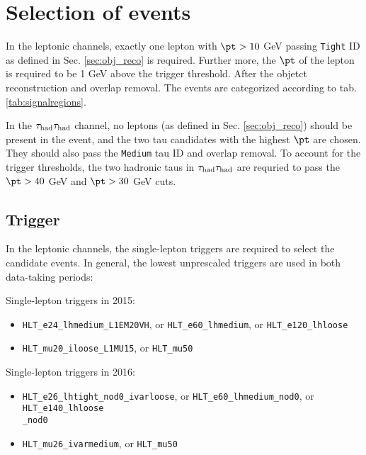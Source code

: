 \section{Selection of events}
\label{sec:selection}

In the leptonic channels, exactly one lepton with $\pt>10$ GeV passing \texttt{Tight} ID as defined in Sec. \ref{sec:obj_reco} is required. %
Further more, the $\pt$ of the lepton is required to be 1 GeV above the trigger threshold. After the objetct reconstruction and overlap removal. The events are categorized according to tab. \ref{tab:signalregions}.


 In the $\tau_\text{had}{}\tau_\text{had}$ channel, no leptons (as defined in Sec. \ref{sec:obj_reco}) should be present in the event, and the two tau candidates with the highest $\pt$ are chosen. They should also pass the \texttt{Medium} tau ID and overlap removal. To account for the trigger thresholds, the two hadronic taus in $\tau_\text{had}{}\tau_\text{had}$ are requried to pass the $\pt>40$ GeV and $\pt>30$ GeV cuts.

\subsection{Trigger}
\label{sec:trigger}

In the leptonic channels, the single-lepton triggers are required to select the candidate events. In general, the lowest unprescaled triggers are used in both data-taking periods:

\begin{description}
\item Single-lepton triggers in 2015:
  
  \begin{itemize}
  \item \texttt{HLT\_e24\_lhmedium\_L1EM20VH}, or \texttt{HLT\_e60\_lhmedium}, or \texttt{HLT\_e120\_lhloose}
  \item \texttt{HLT\_mu20\_iloose\_L1MU15}, or \texttt{HLT\_mu50}
  \end{itemize}
  
\item Single-lepton triggers in 2016:
  
  \begin{itemize}
  \item \texttt{HLT\_e26\_lhtight\_nod0\_ivarloose}, or \texttt{HLT\_e60\_lhmedium\_nod0}, or \texttt{HLT\_e140\_lhloose\\\_nod0}
  \item \texttt{HLT\_mu26\_ivarmedium}, or \texttt{HLT\_mu50}
  \end{itemize}
  
\end{description}

